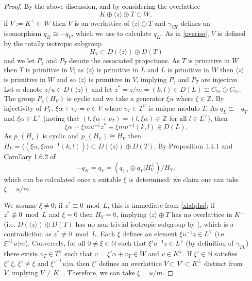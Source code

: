 \documentclass[12pt, a4paper]{article}
\newcommand{\ZZ}{\mathbb{Z}}
\newcommand{\NN}{\mathbb{N}}
\newcommand{\la}{\langle}
\newcommand{\ra}{\rangle}
\newcommand{\op}{\oplus}
\begin{document}
\begin{proof}
  By the above discussion, and by considering the overlattice
  \[
  K \op \la z \ra \op T \subset W,
  \]
  if $V := K^{\perp} \subset W$ then $V$ is an overlattice of $\la z \ra \op T$ and $\gamma_{VK}$ defines an isomorphism $q_K \cong -q_V$, which we use to calculate $q_K$.
As in \eqref{overiso}, $V$ is defined by the totally isotropic subgroup
  \[
  H_V \subset  D(\la z \ra) \op D(T)
  \]
  and we let $P_z$ and $P_T$ denote the associated projections.
    As $T$ is primitive in $W$ then $T$ is primitive in $V$;
    as $\la z \ra$ is primitive in $L$ and $L$ is primitive in $W$ then $\la z \ra$ is primitive in $W$ and so $\la z \ra$ is primitive in $V$,
    implying $P_z$ and $P_T$ are injective.
Let $\alpha$ denote $z/u \in D(\la z \ra)$ and let $z^*=z/m=(k,l) \in D(L) \cong C_{2r} \op C_{2s}$.
    The group $P_z(H_V)$ is cyclic and we take a generator $\xi \alpha$ where $\xi \in \ZZ$.
    By injectivity of $P_T$, $\xi \alpha + v_T = v \in V$ where $v_T \in T^{\vee}$ is unique modulo $T$.
    As $q_L \cong -q_T$ and $\xi \alpha \in L^{\vee}$ (noting that $(l, \xi \alpha + v_T) = (l, \xi \alpha) \in \ZZ$ for all $l \in L^{\vee}$), then
    \begin{equation}\label{xialpha}
      \xi \alpha = \xi m u^{-1} z^* \equiv \xi m u^{-1} (k,l) \in D(L).
    \end{equation}
    As $p_z(H_v)$ is cyclic and $p_z(H_V) \cong H_V$ then
    $H_V = \la (\xi \alpha ,\xi m u^{-1} (k,l) ) \ra \subset D(\la z \ra) \op D(T)$.
  By Proposition 1.4.1 and Corollary 1.6.2 of \cite{Nikulin},
  \begin{equation*}
    -q_K = q_V = (q_{\la z \ra} \op q_T \vert H_V^{\perp})/H_V,
  \end{equation*}
  which can be calculated once a suitable $\xi$ is determined: we claim one can take $\xi=u/m$.
  
  We assume $\xi \neq 0$; if $z^* \equiv 0 \bmod{ L }$, this is immediate from \eqref{xialpha};
  if $z^* \not \equiv 0 \bmod{ L }$ and $\xi = 0$ then $H_V = 0$, implying $\la z \ra \op T$ has no overlattice in $K^{\perp}$ (i.e. $D(\la z \ra) \op D(T)$ has no non-trivial isotropic subgroup by \cite[\S4]{Nikulin}), which is a contradiction as $z^* \not \equiv 0 \bmod{L}$.
  Each $\xi$ defines an element $\xi u^{-1}z \in L^{\vee}$ (i.e. $\xi^{-1}u \vert m$).
  Conversely, for all $0 \neq \xi \in \NN$ such that $\xi'u^{-1} z \in L^{\vee}$ (by definition of $\gamma_{TL}$) there exists $v_T \in T^{\vee}$ such that $v = \xi' \alpha + v_T \in W$ and $v \in K^{\perp}$.
  If $\xi' \in \NN$ satisfies $\xi' \vert \xi$,  $\xi' \neq \xi$ and $\xi'^{-1}u \vert m$ then $\xi'$ defines an overlattice $V \subset V' \subset K^{\perp}$ distinct from $V$, implying $V \neq K^{\perp}$.
  Therefore, we can take $\xi = u/m$.
  

\end{proof}
\end{document}
